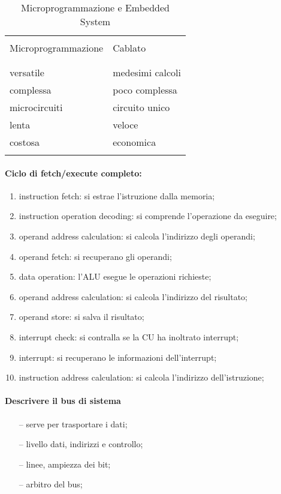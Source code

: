 \documentclass{article}
\begin{document}
\begin{table}[ht]
	\centering
	\begin{tabular}{|l|l|}
		\hline
		  & \\
		Microprogrammazione & Cablato \\
		  &  \\
		\hline
		  & \\
	versatile & medesimi calcoli\\
  complessa & poco complessa\\
  microcircuiti & circuito unico\\
  lenta & veloce\\
  costosa & economica\\
  & \\
  \hline
	\end{tabular}
	\caption{Microprogrammazione e Embedded System}
\end{table}


\paragraph{Ciclo di fetch/execute completo:}
\begin{enumerate}
    \item instruction fetch: si estrae l'istruzione dalla memoria;
		\item instruction operation decoding: si comprende l'operazione da eseguire;
    \item operand address calculation: si calcola l'indirizzo degli operandi;
    \item operand fetch: si recuperano gli operandi;
    \item data operation: l'ALU esegue le operazioni richieste;
    \item operand address calculation: si calcola l'indirizzo del risultato;
    \item operand store: si salva il risultato;
    \item interrupt check: si contralla se la CU ha inoltrato interrupt;
    \item interrupt: si recuperano le informazioni dell'interrupt;
    \item instruction address calculation: si calcola l'indirizzo dell'istruzione;
\end{enumerate}

\paragraph{Descrivere il bus di sistema}
\begin{itemize}
	\item[--] serve per trasportare i dati;
	\item[--] livello dati, indirizzi e controllo;
	\item[--] linee, ampiezza dei bit;
	\item[--] arbitro del bus;
\end{itemize}
\end{document}
